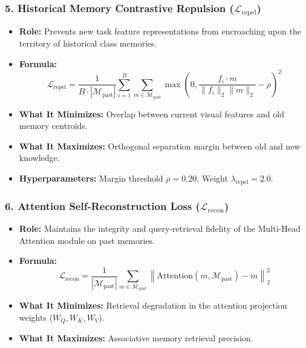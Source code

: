 \documentclass[11pt,a4paper]{article}
\begin{document}
    \subsubsection{5. Historical Memory Contrastive Repulsion ($\mathcal{L}_{\text{repel}}$)}
    \begin{itemize}[leftmargin=*]
        \item \textbf{Role:} Prevents new task feature representations from encroaching upon the territory of historical class memories.
        \item \textbf{Formula:}
        \begin{equation}
            \mathcal{L}_{\text{repel}} = \frac{1}{B \cdot |\mathcal{M}_{\text{past}}|} \sum_{i=1}^{B} \sum_{m \in \mathcal{M}_{\text{past}}} \max\left(0, \frac{f_i \cdot m}{\|f_i\|_2 \|m\|_2} - \rho\right)^2
        \end{equation}
        \item \textbf{What It Minimizes:} Overlap between current visual features and old memory centroids.
        \item \textbf{What It Maximizes:} Orthogonal separation margin between old and new knowledge.
        \item \textbf{Hyperparameters:} Margin threshold $\rho = 0.20$, Weight $\lambda_{\text{repel}} = 2.0$.
    \end{itemize}

    \subsubsection{6. Attention Self-Reconstruction Loss ($\mathcal{L}_{\text{recon}}$)}
    \begin{itemize}[leftmargin=*]
        \item \textbf{Role:} Maintains the integrity and query-retrieval fidelity of the Multi-Head Attention module on past memories.
        \item \textbf{Formula:}
        \begin{equation}
            \mathcal{L}_{\text{recon}} = \frac{1}{|\mathcal{M}_{\text{past}}|} \sum_{m \in \mathcal{M}_{\text{past}}} \left\| \text{Attention}(m, \mathcal{M}_{\text{past}}) - m \right\|_2^2
        \end{equation}
        \item \textbf{What It Minimizes:} Retrieval degradation in the attention projection weights ($W_Q, W_K, W_V$).
        \item \textbf{What It Maximizes:} Associative memory retrieval precision.
    \end{itemize}
\end{document}
